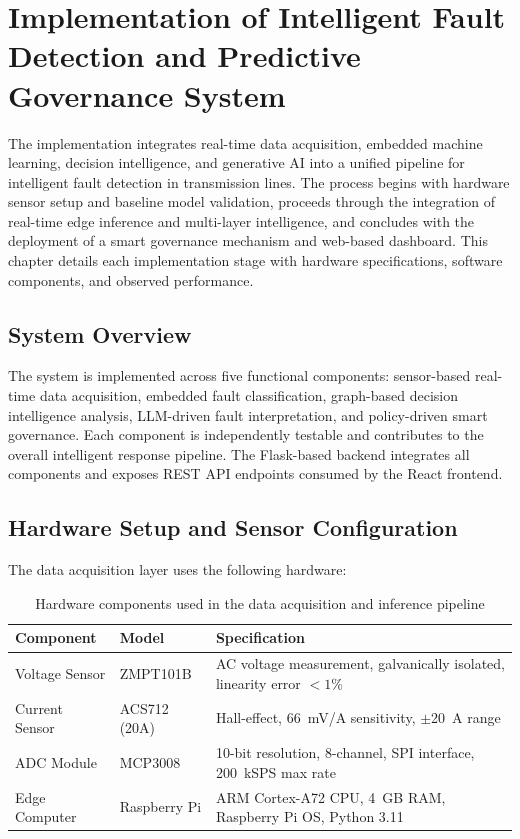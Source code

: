\chapter{Implementation of Intelligent Fault Detection and Predictive Governance System}

The implementation integrates real-time data acquisition, embedded machine learning, decision intelligence, and generative AI into a unified pipeline for intelligent fault detection in transmission lines. The process begins with hardware sensor setup and baseline model validation, proceeds through the integration of real-time edge inference and multi-layer intelligence, and concludes with the deployment of a smart governance mechanism and web-based dashboard. This chapter details each implementation stage with hardware specifications, software components, and observed performance.

\section{System Overview}

The system is implemented across five functional components: sensor-based real-time data acquisition, embedded fault classification, graph-based decision intelligence analysis, LLM-driven fault interpretation, and policy-driven smart governance. Each component is independently testable and contributes to the overall intelligent response pipeline. The Flask-based backend integrates all components and exposes REST API endpoints consumed by the React frontend.

\section{Hardware Setup and Sensor Configuration}

The data acquisition layer uses the following hardware:

\begin{table}[H]
\centering
\fontsize{10}{12}\selectfont
\begin{tabular}{|p{4cm}|p{3cm}|p{6cm}|}
\hline
\textbf{Component} & \textbf{Model} & \textbf{Specification} \\
\hline
Voltage Sensor & ZMPT101B & AC voltage measurement, galvanically isolated, linearity error $< 1\%$ \\
\hline
Current Sensor & ACS712 (20A) & Hall-effect, 66~mV/A sensitivity, $\pm$20~A range \\
\hline
ADC Module & MCP3008 & 10-bit resolution, 8-channel, SPI interface, 200~kSPS max rate \\
\hline
Edge Computer & Raspberry Pi & ARM Cortex-A72 CPU, 4~GB RAM, Raspberry Pi OS, Python 3.11 \\
\hline
\end{tabular}
\caption{Hardware components used in the data acquisition and inference pipeline}
\label{c4:tab:hardware}
\end{table}

